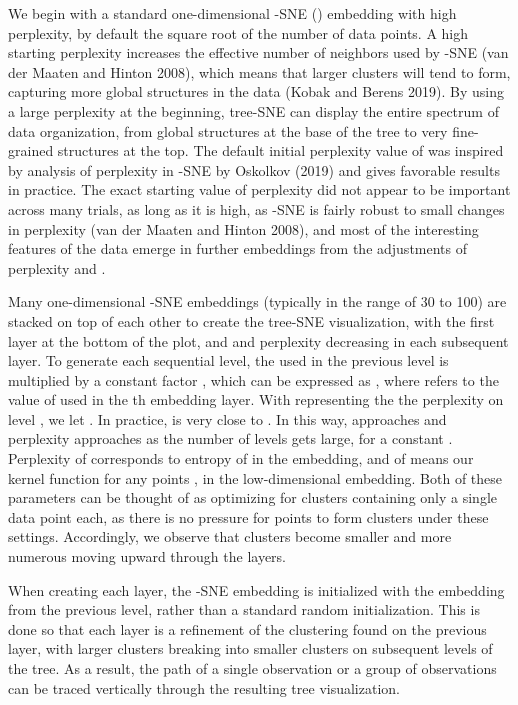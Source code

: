 \documentclass{article}
\begin{document}
We begin with a standard one-dimensional -SNE () embedding with high perplexity, by default the square root of the number of data points. A high starting perplexity increases the effective number of neighbors used by -SNE (van der Maaten and Hinton 2008), which means that larger clusters will tend to form, capturing more global structures in the data (Kobak and Berens 2019). By using a large perplexity at the beginning, tree-SNE can display the entire spectrum of data organization, from global structures at the base of the tree to very fine-grained structures at the top. The default initial perplexity value of  was inspired by analysis of perplexity in -SNE by Oskolkov (2019) and gives favorable results in practice. The exact starting value of perplexity did not appear to be important across many trials, as long as it is high, as -SNE is fairly robust to small changes in perplexity (van der Maaten and Hinton 2008), and most of the interesting features of the data emerge in further embeddings from the adjustments of perplexity and .

Many one-dimensional -SNE embeddings (typically in the range of 30 to 100) are stacked on top of each other to create the tree-SNE visualization, with the first layer at the bottom of the plot, and  and perplexity decreasing in each subsequent layer. To generate each sequential level, the  used in the previous level is multiplied by a constant factor , which can be expressed as , where  refers to the value of  used in the th embedding layer. With  representing the the perplexity on level , we let . In practice,  is very close to . In this way,  approaches  and perplexity approaches  as the number of levels  gets large, for a constant . Perplexity of  corresponds to entropy of  in the embedding, and  of  means our kernel function  for any points ,  in the low-dimensional embedding. Both of these parameters can be thought of as optimizing for clusters containing only a single data point each, as there is no pressure for points to form clusters under these settings. Accordingly, we observe that clusters become smaller and more numerous moving upward through the layers. 

When creating each layer, the -SNE embedding is initialized with the  embedding from the previous level, rather than a standard random initialization. This is done so that each layer is a refinement of the clustering found on the previous layer, with larger clusters breaking into smaller clusters on subsequent levels of the tree. As a result, the path of a single observation or a group of observations can be traced vertically through the resulting tree visualization.  
\end{document}
